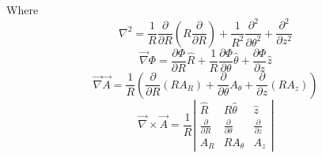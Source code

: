 \documentclass[12pt, a4paper]{article}
\begin{document}
Where
\begin{equation}
    \nabla^2=\frac{1}{R}\frac{\partial}{\partial R}\left(R\frac{\partial}{\partial R}\right) + 
    \frac{1}{R^2}\frac{\partial^2}{\partial\theta^2}+\frac{\partial^2}{\partial z^2}
\end{equation}
\begin{equation}
    \vec\nabla\Phi=\frac{\partial \Phi}{\partial R}\hat{R}+\frac{1}{R}\frac{\partial\Phi}{\partial\theta}\hat{\theta}+\frac{\partial\Phi}{\partial z}\hat{z}
\end{equation}
\begin{equation}
    \vec\nabla\vec A=\frac{1}{R}\left(
        \frac{\partial}{\partial R}(RA_R)+\frac{\partial}{\partial\theta}A_\theta+\frac{\partial}{\partial z}(RA_z)
     \right)
\end{equation}
\begin{equation}
    \vec\nabla\times\vec A = \frac{1}{R}\left|
    \begin{matrix}
        \hat{R} & R\hat{\theta} & \hat{z} \\
        \frac{\partial}{\partial R} & \frac{\partial}{\partial \theta} & \frac{\partial}{\partial z} \\
        A_R & RA_\theta & A_z
    \end{matrix}
    \right|
\end{equation}
\end{document}

